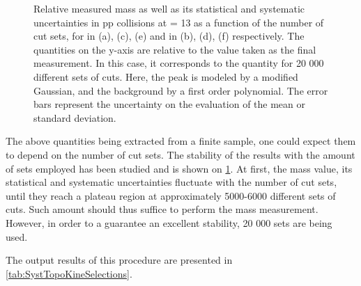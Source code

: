 \begin{figure}[!p]
\hspace*{-1.5cm}
\hspace*{-1.5cm}
\hspace*{-1.5cm}
\caption{Relative measured mass as well as its statistical and systematic uncertainties in pp collisions at \sqrtS = 13 \tev as a function of the number of cut sets, for \rmXi in (a), (c), (e) and \rmOmega in (b), (d), (f) respectively. The quantities on the y-axis are relative to the value taken as the final measurement. In this case, it corresponds to the quantity for 20 000 different sets of cuts. Here, the peak is modeled by a modified Gaussian, and the background by a first order polynomial. The error bars represent the uncertainty on the evaluation of the mean or standard deviation.}
	\label{fig:MassVsNentries}
\end{figure}

The above quantities being extracted from a finite sample, one could expect them to depend on the number of cut sets. The stability of the results with the amount of sets employed has been studied and is shown on \fig\ref{fig:MassVsNentries}. At first, the mass value, its statistical and systematic uncertainties fluctuate with the number of cut sets, until they reach a plateau region at approximately 5000-6000 different sets of cuts. Such amount should thus suffice to perform the mass measurement. However, in order to a guarantee an excellent stability, 20 000 sets are being used.

The output results of this procedure are presented in \tab\ref{tab:SystTopoKineSelections}.

